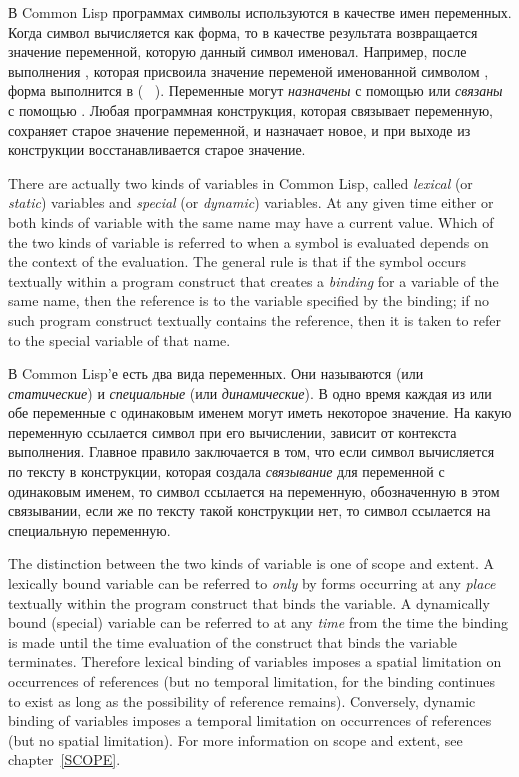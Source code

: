В Common Lisp программах символы используются в качестве имен переменных.
Когда символ вычисляется как форма, то в качестве результата возвращается
значение переменной, которую данный символ именовал. Например, после выполнения
, которая присвоила значение  переменой именованной
символом , форма  выполнится в  ( \EV\
).
Переменные могут \textit{назначены} с помощью  или \textit{связаны} с
помощью \cd{let}.
Любая программная конструкция, которая связывает переменную, сохраняет старое
значение переменной, и назначает новое, и при выходе из конструкции
восстанавливается старое значение.

There are actually two kinds of variables in Common Lisp, called \textit{lexical} (or
\textit{static}) variables and \textit{special} (or \textit{dynamic}) variables.
At any given time either or both kinds of variable with the same name may
have a current value.  Which of the two kinds of variable is referred to
when a symbol is evaluated depends on the context of the evaluation.
The general rule is that if the symbol occurs textually within a program
construct that creates a \textit{binding} for a variable of the same name,
then the reference is to the variable specified by the binding;
if no such program construct textually contains the reference, then
it is taken to refer to the special variable of that name.

В Common Lisp'е есть два вида переменных. Они называются  (или
\textit{статические}) и \textit{специальные} (или \textit{динамические}).
В одно время каждая из или обе переменные с одинаковым именем могут иметь
некоторое значение. На какую переменную ссылается символ при его вычислении,
зависит от контекста выполнения. Главное правило заключается в том, что если
символ вычисляется по тексту в конструкции, которая создала \textit{связывание} для
переменной с одинаковым именем, то символ ссылается на переменную, обозначенную
в этом связывании, если же по тексту такой конструкции нет, то символ ссылается
на специальную переменную.

The distinction between the two kinds of variable is one of scope
and extent.  A lexically bound variable can be referred to \textit{only}
by forms occurring at any \textit{place} textually within the program construct that
binds the variable.  A dynamically bound (special) variable can
be referred to at any \textit{time} from the time the binding is made
until the time evaluation of the construct that binds the variable
terminates.  Therefore lexical binding of variables
imposes a spatial limitation
on occurrences of references (but no temporal limitation, for the
binding continues to exist as long as the possibility of reference
remains).  Conversely, dynamic binding of variables imposes a temporal
limitation on occurrences of references (but no spatial limitation).
For more information on scope and extent, see chapter~\ref{SCOPE}.

